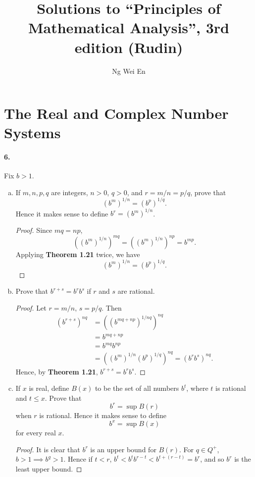 \documentclass{article}
\title{Solutions to ``Principles of Mathematical Analysis'', 3rd edition (Rudin)}
\author{Ng Wei En}
\begin{document}
\maketitle
\tableofcontents
\newpage

\section{The Real and Complex Number Systems}

\paragraph{6.} Fix $b > 1$.
\begin{enumerate}[(a)]
  \item If $m, n, p, q$ are integers, $n > 0$, $q > 0$, and $r = m/n = p/q$,
    prove that \[
      (b^m)^{1/n} = (b^p)^{1/q}.
    \] Hence it makes sense to define $b^r = (b^m)^{1/n}$.
    \begin{proof}
      Since $mq = np$, \[
        ((b^m)^{1/n})^{mq} = ((b^m)^{1/n})^{np} = b^{mp}.
      \] Applying \textbf{Theorem 1.21} twice, we have \[
        (b^m)^{1/n} = (b^p)^{1/q}.
      \]
    \end{proof}

  \item Prove that $b^{r+s} = b^rb^s$ if $r$ and $s$ are rational.
    \begin{proof}
      Let $r = m/n$, $s = p/q$. Then
      \begin{align*}
        (b^{r+s})^{nq}
        &= ((b^{mq+np})^{1/nq})^{nq} \\
        &= b^{mq+np} \\
        &= b^{mq}b^{np} \\
        &= ((b^m)^{1/n}(b^p)^{1/q})^{nq} = (b^rb^s)^{nq}.
      \end{align*}
      Hence, by \textbf{Theorem 1.21}, $b^{r+s} = b^rb^s$.
    \end{proof}

  \item If $x$ is real, define $B(x)$ to be the set of all numbers $b^t$, where
    $t$ is rational and $t \leq x$. Prove that \[
      b^r = \sup B(r)
    \] when $r$ is rational. Hence it makes sense to define \[
      b^x = \sup B(x)
    \] for every real $x$.
    \begin{proof}
      It is clear that $b^r$ is an upper bound for $B(r)$. For $q \in Q^+$, $b
      > 1 \implies b^q > 1$. Hence if $t < r$, $b^t < b^tb^{r-t} < b^{t+(r-t)}
      = b^r$, and so $b^r$ is the least upper bound.
    \end{proof}


\end{enumerate}
\end{document}
